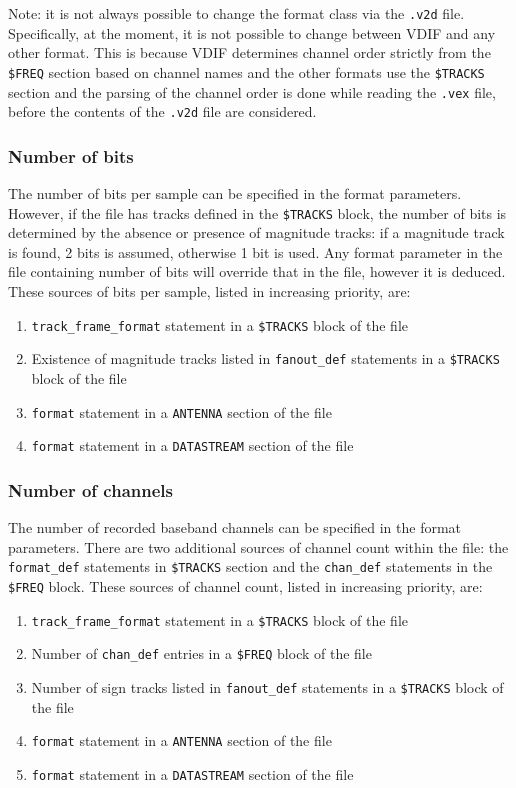 \documentclass[12pt]{article}
\begin{document}
Note: it is not always possible to change the format class via the {\tt .v2d} file.
Specifically, at the moment, it is not possible to change between VDIF and any other format.
This is because VDIF determines channel order strictly from the {\tt \$FREQ} section based on channel names and the other formats use the {\tt \$TRACKS} section and the parsing of the channel order is done while reading the {\tt .vex} file, before the contents of the {\tt .v2d} file are considered.

\subsubsection{Number of bits}

The number of bits per sample can be specified in the format parameters.
However, if the \vx file has tracks defined in the {\tt \$TRACKS} block, the number of bits is determined by the absence or presence of magnitude tracks: if a magnitude track is found, 2 bits is assumed, otherwise 1 bit is used.
Any format parameter in the \vd file containing number of bits will override that in the \vx file, however it is deduced.
These sources of bits per sample, listed in increasing priority, are:
\begin{enumerate}
\item {\tt track\_frame\_format} statement in a {\tt \$TRACKS} block of the \vx file
\item Existence of magnitude tracks listed in {\tt fanout\_def} statements in a {\tt \$TRACKS} block of the \vx file
\item {\tt format} statement in a {\tt ANTENNA} section of the \vd file
\item {\tt format} statement in a {\tt DATASTREAM} section of the \vd file
\end{enumerate}

\subsubsection{Number of channels}

The number of recorded baseband channels can be specified in the format parameters.
There are two additional sources of channel count within the \vx file: the {\tt format\_def} statements in {\tt \$TRACKS} section and the {\tt chan\_def} statements in the {\tt \$FREQ} block. 
These sources of channel count, listed in increasing priority, are:
\begin{enumerate}
\item {\tt track\_frame\_format} statement in a {\tt \$TRACKS} block of the \vx file
\item Number of {\tt chan\_def} entries in a {\tt \$FREQ} block of the \vx file
\item Number of sign tracks listed in {\tt fanout\_def} statements in a {\tt \$TRACKS} block of the \vx file
\item {\tt format} statement in a {\tt ANTENNA} section of the \vd file
\item {\tt format} statement in a {\tt DATASTREAM} section of the \vd file
\end{enumerate}
\end{document}
